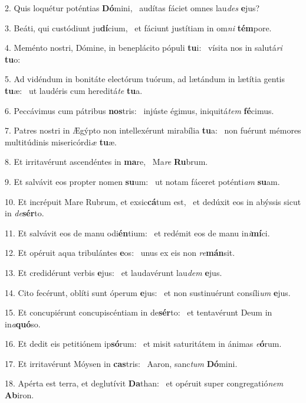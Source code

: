 2. Quis loquétur poténtias \textbf{Dó}mini, \ast\  audítas fáciet omnes lau\textit{des} \textbf{e}jus?\

3. Beáti, qui custódiunt ju\textbf{dí}cium, \ast\  et fáciunt justítiam in om\textit{ni} \textbf{tém}pore.\

4. Meménto nostri, Dómine, in beneplácito pópuli \textbf{tu}i: \ast\  vísita nos in salutá\textit{ri} \textbf{tu}o:\

5. Ad vidéndum in bonitáte electórum tuórum, ad lætándum in lætítia gentis \textbf{tu}æ: \ast\  ut laudéris cum hereditá\textit{te} \textbf{tu}a.\

6. Peccávimus cum pátribus \textbf{nos}tris: \ast\  injúste égimus, iniquitá\textit{tem} \textbf{fé}cimus.\

7. Patres nostri in Ægýpto non intellexérunt mirabília \textbf{tu}a: \ast\  non fuérunt mémores multitúdinis misericórdi\textit{æ} \textbf{tu}æ.\

8. Et irritavérunt ascendéntes in \textbf{ma}re, \ast\  Ma\textit{re} \textbf{Ru}brum.\

9. Et salvávit eos propter nomen \textbf{su}um: \ast\  ut notam fáceret poténti\textit{am} \textbf{su}am.\

10. Et incrépuit Mare Rubrum, et exsic\textbf{cá}tum est, \ast\  et dedúxit eos in abýssis sicut in \textit{de}\textbf{sér}to.\

11. Et salvávit eos de manu odi\textbf{én}tium: \ast\  et redémit eos de manu in\textit{i}\textbf{mí}ci.\

12. Et opéruit aqua tribulántes \textbf{e}os: \ast\  unus ex eis non \textit{re}\textbf{mán}sit.\

13. Et credidérunt verbis \textbf{e}jus: \ast\  et laudavérunt lau\textit{dem} \textbf{e}jus.\

14. Cito fecérunt, oblíti sunt óperum \textbf{e}jus: \ast\  et non sustinuérunt consíli\textit{um} \textbf{e}jus.\

15. Et concupiérunt concupiscéntiam in de\textbf{sér}to: \ast\  et tentavérunt Deum in in\textit{a}\textbf{quó}so.\

16. Et dedit eis petitiónem ip\textbf{só}rum: \ast\  et misit saturitátem in ánimas \textit{e}\textbf{ó}rum.\

17. Et irritavérunt Móysen in \textbf{cas}tris: \ast\  Aaron, sanc\textit{tum} \textbf{Dó}mini.\

18. Apérta est terra, et deglutívit \textbf{Da}than: \ast\  et opéruit super congregatió\textit{nem} \textbf{Ab}iron.\

